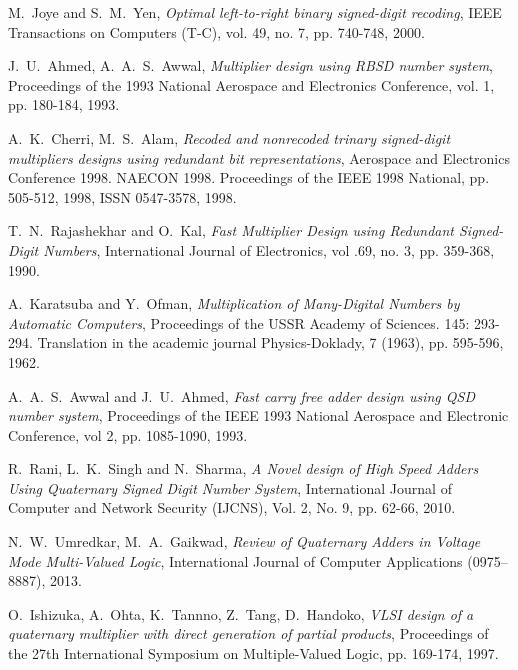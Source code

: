 \documentclass[conference]{IEEEtran}
\begin{document}
\begin{thebibliography}{1}
M.~Joye and S.~M.~Yen, \emph{Optimal left-to-right binary signed-digit recoding}, IEEE Transactions on Computers (T-C), vol. 49, no. 7, pp. 740-748, 2000.

J.~U.~Ahmed, A.~A.~S.~Awwal, \emph{Multiplier design using RBSD number system}, Proceedings of the 1993 National Aerospace and Electronics Conference, vol. 1, pp. 180-184, 1993.

A.~K.~Cherri, M.~S.~Alam, \emph{Recoded and nonrecoded trinary signed-digit multipliers designs using redundant bit representations}, Aerospace and Electronics Conference 1998. NAECON 1998. Proceedings of the IEEE 1998 National, pp. 505-512, 1998, ISSN 0547-3578, 1998.

T.~N.~Rajashekhar and O.~Kal, \emph{Fast Multiplier Design using Redundant Signed-Digit Numbers}, International Journal of Electronics, vol .69, no. 3, pp. 359-368, 1990.

A.~Karatsuba and Y.~Ofman, \emph{Multiplication of Many-Digital Numbers by Automatic Computers}, Proceedings of the USSR Academy of Sciences. 145: 293-294. Translation in the academic journal Physics-Doklady, 7 (1963), pp. 595-596, 1962.

A.~A.~S.~Awwal and J.~U.~Ahmed, \emph{Fast carry free adder design using QSD number system}, Proceedings of the IEEE 1993 National Aerospace and Electronic Conference, vol 2, pp. 1085-1090, 1993.

R.~Rani, L.~K.~Singh and N.~Sharma, \emph{A Novel design of High Speed Adders Using Quaternary Signed Digit Number System}, International Journal of Computer and Network Security (IJCNS), Vol. 2, No. 9, pp. 62-66, 2010.

N.~W.~Umredkar, M.~A.~Gaikwad, \emph{Review of Quaternary Adders in Voltage Mode  Multi-Valued Logic}, International Journal of Computer Applications (0975–8887), 2013.


O.~Ishizuka, A.~Ohta, K.~Tannno, Z.~Tang, D.~Handoko, \emph{VLSI design of a quaternary multiplier with direct generation of partial products}, Proceedings of the 27th International Symposium on Multiple-Valued Logic, pp. 169-174, 1997.


\end{thebibliography}
\end{document}
